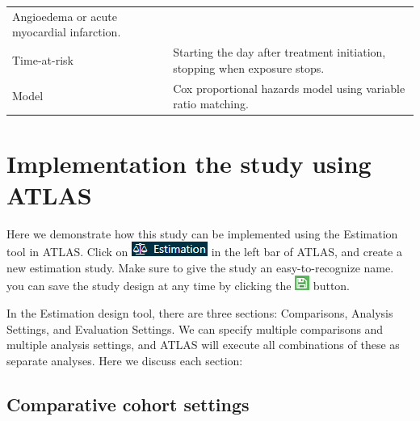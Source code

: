 \documentclass[11pt]{book}
\begin{document}
\begin{longtable}[]{@{}ll@{}}
\begin{minipage}[t]{0.71\columnwidth}
Angioedema or acute myocardial infarction.\strut
\end{minipage}\tabularnewline
\begin{minipage}[t]{0.23\columnwidth}\raggedright\strut
Time-at-risk\strut
\end{minipage} & \begin{minipage}[t]{0.71\columnwidth}\raggedright\strut
Starting the day after treatment initiation, stopping when exposure
stops.\strut
\end{minipage}\tabularnewline
\begin{minipage}[t]{0.23\columnwidth}\raggedright\strut
Model\strut
\end{minipage} & \begin{minipage}[t]{0.71\columnwidth}\raggedright\strut
Cox proportional hazards model using variable ratio matching.\strut
\end{minipage}\tabularnewline
\bottomrule
\end{longtable}

\section{Implementation the study using
ATLAS}\label{implementation-the-study-using-atlas}

Here we demonstrate how this study can be implemented using the
Estimation tool in ATLAS. Click on
\includegraphics{images/PopulationLevelEstimation/estimation.png} in the
left bar of ATLAS, and create a new estimation study. Make sure to give
the study an easy-to-recognize name. you can save the study design at
any time by clicking the
\includegraphics{images/PopulationLevelEstimation/save.png} button.

In the Estimation design tool, there are three sections: Comparisons,
Analysis Settings, and Evaluation Settings. We can specify multiple
comparisons and multiple analysis settings, and ATLAS will execute all
combinations of these as separate analyses. Here we discuss each
section:

\subsection{Comparative cohort settings}\label{ComparisonSettings}
\end{document}
